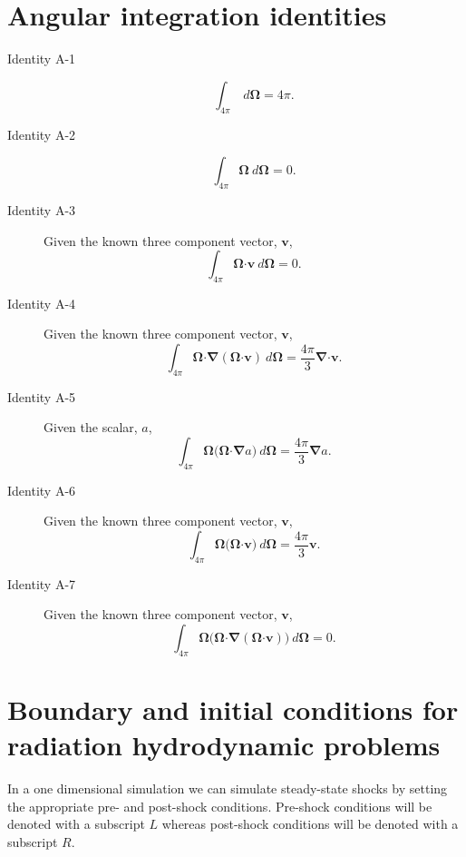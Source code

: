 \documentclass[10pt,letterpaper,notitlepage]{article}
\numberwithin{equation}{section}
\newcommand{\Omegabf}{\mathbf{\Omega}}
\newcommand{\bnabla}{\boldsymbol{\nabla}}
\newcommand{\dotp}{\boldsymbol{\cdot}}
\begin{document}
\newpage
\begin{appendices}
\section{Angular integration identities} \label{appendix:angle_integration_identities}
\begin{description}
	\item [Identity A-1]
	$$\int_{4\pi}  \ d\Omegabf = 4\pi.$$
	
	\item [Identity A-2]
	$$\int_{4\pi} \Omegabf \ d\Omegabf = 0.$$
	
	\item [Identity A-3] Given the known three component vector, $\mathbf{v}$,
	$$\int_{4\pi} \Omegabf \dotp \mathbf{v} \ d\Omegabf = 0.$$
	
	\item [Identity A-4] Given the known three component vector, $\mathbf{v}$,
	$$\int_{4\pi} \Omegabf \dotp \bnabla (\Omegabf \dotp \mathbf{v}) \ d\Omegabf = \frac{4\pi}{3} \bnabla \dotp \mathbf{v}.$$
	
	\item [Identity A-5] Given the scalar, $a$,
	$$\int_{4\pi} \Omegabf \biggr( \Omegabf \dotp \bnabla a \biggr) \ d\Omegabf = \frac{4\pi}{3} \bnabla a.$$
	
	\item [Identity A-6] Given the known three component vector, $\mathbf{v}$,
	$$\int_{4\pi} \Omegabf \biggr( \Omegabf \dotp \mathbf{v} \biggr) \ d\Omegabf = \frac{4\pi}{3} \mathbf{v} .$$
	
	\item [Identity A-7] Given the known three component vector, $\mathbf{v}$,
	$$\int_{4\pi} \Omegabf \biggr( \Omegabf \dotp \bnabla (\Omegabf \dotp \mathbf{v}) \biggr) \ d\Omegabf = 0 .$$
	
\end{description}

\newpage
\section{Boundary and initial conditions for radiation hydrodynamic problems} \label{appendix:bndry_initial_conditions}
In a one dimensional simulation we can simulate steady-state shocks by setting the appropriate pre- and post-shock conditions. Pre-shock conditions will be denoted with a subscript $L$ whereas post-shock conditions will be denoted with a subscript $R$. 


\end{appendices}
\end{document}
